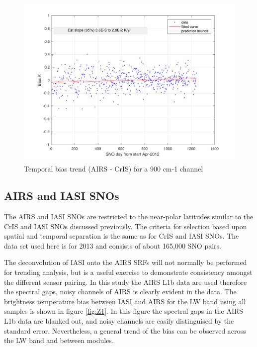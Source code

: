 \documentclass[11pt]{article}
\begin{document}
\begin{figure}[htb]
\centering
\includegraphics[width=.6\linewidth]{./figs/AC_aslSNO_900wn_biasTrend_screened.pdf}
\caption{\label{fig:orgparagraph18}
  Temporal bias trend (AIRS - CrIS) for a 900 cm-1 channel}
\label{fig:Y9}
\end{figure}


\subsection{AIRS and IASI SNOs}
\label{sec:orgheadline10}
The AIRS and IASI SNOs are restricted to the near-polar latitudes similar to the 
CrIS and IASI SNOs discussed previously. The criteria for selection based upon spatial and temporal separation is the same as for CrIS and IASI SNOs. The data set used here is for 2013 and consists of about 165,000 SNO pairs. 

The deconvolution of IASI onto the AIRS SRFs will not normally be performed for trending analysis, but is a useful exercise to demonstrate consistency amongst the different sensor pairing. In this study the AIRS L1b data are used therefore the spectral gaps, noisy channels of AIRS is clearly evident in the data. The
brightness temperature bias between IASI and AIRS for the LW band using all samples is shown in figure \ref{fig:Z1}. In this figure the spectral gaps in the AIRS L1b data are blanked out, and noisy channels are easily distinguised by the standard error. Nevertheless, a general trend of the bias can be observed across the LW band and between modules.
\end{document}

